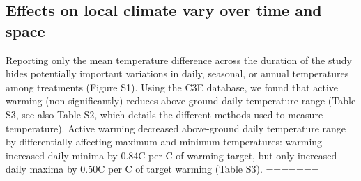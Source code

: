 \documentclass{article}
\begin{document}
\subsection* {Effects on local climate vary over time and space}
Reporting only the mean temperature difference across the duration of the study hides potentially important variations in daily, seasonal, or annual temperatures among treatments (Figure S1). Using the C3E database, we found that active warming (non-significantly) reduces above-ground daily temperature range (Table S3, see also Table S2, which details the different methods used to measure temperature). Active warming decreased above-ground daily temperature range by differentially affecting maximum and minimum temperatures: warming increased daily minima by 0.84\degree C per \degree C of warming target, but only increased daily maxima by 0.50\degree C per \degree C of target warming (Table S3). %
=======
\end{document}
